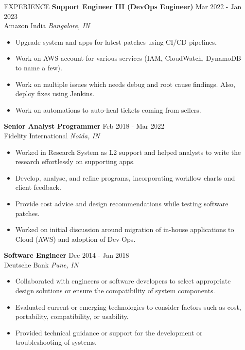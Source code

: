 \documentclass{resume} %
\begin{document}
\begin{sloppypar}
\begin{rSection}{EXPERIENCE}
        \textbf{Support Engineer III (DevOps Engineer)} \hfill Mar 2022 - Jan 2023\\
        Amazon India \hfill \textit{Bangalore, IN}
        \begin{itemize}
            \itemsep -3pt {}
            \item Upgrade system and apps for latest patches using CI/CD pipelines.
            \item Work on AWS account for various services (IAM, CloudWatch, DynamoDB to name a few).
            \item Work on multiple issues which needs debug and root cause findings. Also, deploy fixes using Jenkins.
            \item Work on automations to auto-heal tickets coming from sellers.
        \end{itemize}

        \textbf{Senior Analyst Programmer} \hfill Feb 2018 - Mar 2022\\
        Fidelity International \hfill \textit{Noida, IN}
        \begin{itemize}
            \itemsep -3pt {}
            \item Worked in Research System as L2 support and helped analysts to write the research effortlessly on supporting apps.
            \item Develop, analyse, and refine programs, incorporating workflow charts and client feedback.
            \item Provide cost advice and design recommendations while testing software patches.
            \item Worked on initial discussion around migration of in-house applications to Cloud (AWS) and adoption of Dev-Ops.
        \end{itemize}

        \textbf{Software Engineer} \hfill Dec 2014 - Jan 2018\\
        Deutsche Bank \hfill \textit{Pune, IN}
        \begin{itemize}
            \itemsep -3pt {}
            \item Collaborated with engineers or software developers to select appropriate design solutions or ensure the compatibility of system components.
            \item Evaluated current or emerging technologies to consider factors such as cost, portability, compatibility, or usability.
            \item Provided technical guidance or support for the development or troubleshooting of systems.
        \end{itemize}


\end{rSection}
\end{sloppypar}
\end{document}
